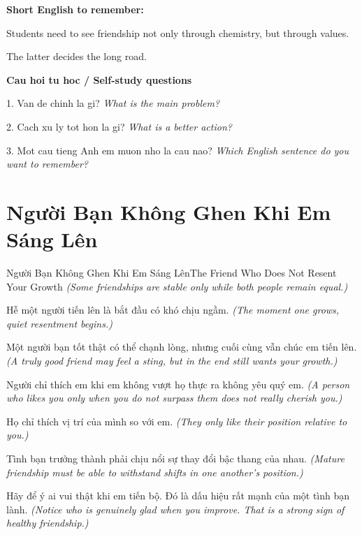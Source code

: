 \begin{ghinhoanh}
\textbf{Short English to remember:}

Students need to see friendship not only through chemistry, but through values.

The latter decides the long road.

\end{ghinhoanh}

\begin{tuhocnhanh}
\textbf{Cau hoi tu hoc / Self-study questions}

1. Van de chinh la gi? \textit{What is the main problem?}

2. Cach xu ly tot hon la gi? \textit{What is a better action?}

3. Mot cau tieng Anh em muon nho la cau nao? \textit{Which English sentence do you want to remember?}
\end{tuhocnhanh}
\ngancach

\section{Người Bạn Không Ghen Khi Em Sáng Lên}
\begin{truyen}{Người Bạn Không Ghen Khi Em Sáng Lên}{The Friend Who Does Not Resent Your Growth}
\textit{(Some friendships are stable only while both people remain equal.)}

Hễ một người tiến lên là bắt đầu có khó chịu ngầm.
\textit{(The moment one grows, quiet resentment begins.)}

Một người bạn tốt thật có thể chạnh lòng, nhưng cuối cùng vẫn chúc em tiến lên.
\textit{(A truly good friend may feel a sting, but in the end still wants your growth.)}

Người chỉ thích em khi em không vượt họ thực ra không yêu quý em.
\textit{(A person who likes you only when you do not surpass them does not really cherish you.)}

Họ chỉ thích vị trí của mình so với em.
\textit{(They only like their position relative to you.)}

Tình bạn trưởng thành phải chịu nổi sự thay đổi bậc thang của nhau.
\textit{(Mature friendship must be able to withstand shifts in one another’s position.)}

\end{truyen}

\begin{baihoc}
Hãy để ý ai vui thật khi em tiến bộ. Đó là dấu hiệu rất mạnh của một tình bạn lành.
\textit{(Notice who is genuinely glad when you improve. That is a strong sign of healthy friendship.)}
\end{baihoc}

